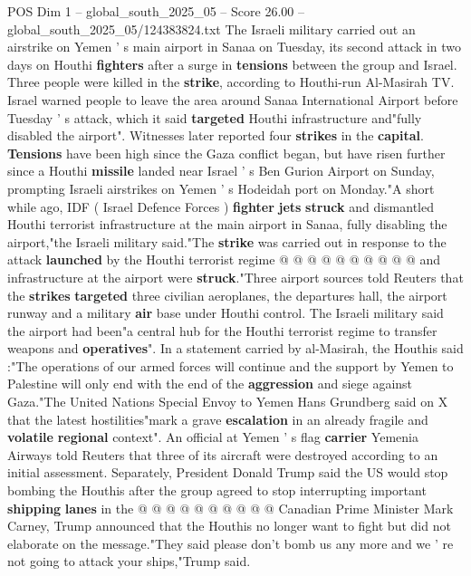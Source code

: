 \begin{textsample}{POS Dim 1 – global\_south\_2025\_05 – Score 26.00 – global\_south\_2025\_05/124383824.txt}  \label{ex:f1_pos_281}
The Israeli military carried out an airstrike on Yemen ' s main airport in Sanaa on Tuesday, its second attack in two days on Houthi \textbf{fighters} after a surge in \textbf{tensions} between the group and Israel.
Three people were killed in the \textbf{strike}, according to Houthi-run Al-Masirah TV.
Israel warned people to leave the area around Sanaa International Airport before Tuesday ' s attack, which it said \textbf{targeted} Houthi infrastructure and"fully disabled the airport".
Witnesses later reported four \textbf{strikes} in the \textbf{capital}. \textbf{Tensions} have been high since the Gaza conflict began, but have risen further since a Houthi \textbf{missile} landed near Israel ' s Ben Gurion Airport on Sunday, prompting Israeli airstrikes on Yemen ' s Hodeidah port on Monday."A short while ago, IDF ( Israel Defence Forces ) \textbf{fighter} \textbf{jets} \textbf{struck} and dismantled Houthi terrorist infrastructure at the main airport in Sanaa, fully disabling the airport,"the Israeli military said."The \textbf{strike} was carried out in response to the attack \textbf{launched} by the Houthi terrorist regime @ @ @ @ @ @ @ @ @ @ and infrastructure at the airport were \textbf{struck}."Three airport sources told Reuters that the \textbf{strikes} \textbf{targeted} three civilian aeroplanes, the departures hall, the airport runway and a military \textbf{air} base under Houthi control.
The Israeli military said the airport had been"a central hub for the Houthi terrorist regime to transfer weapons and \textbf{operatives}".
In a statement carried by al-Masirah, the Houthis said :"The operations of our armed forces will continue and the support by Yemen to Palestine will only end with the end of the \textbf{aggression} and siege against Gaza."The United Nations Special Envoy to Yemen Hans Grundberg said on X that the latest hostilities"mark a grave \textbf{escalation} in an already fragile and \textbf{volatile} \textbf{regional} context".
An official at Yemen ' s flag \textbf{carrier} Yemenia Airways told Reuters that three of its aircraft were destroyed according to an initial assessment.
Separately, President Donald Trump said the US would stop bombing the Houthis after the group agreed to stop interrupting important \textbf{shipping} \textbf{lanes} in the @ @ @ @ @ @ @ @ @ @ Canadian Prime Minister Mark Carney, Trump announced that the Houthis no longer want to fight but did not elaborate on the message."They said please don't bomb us any more and we ' re not going to attack your ships,"Trump said.

\end{textsample}
